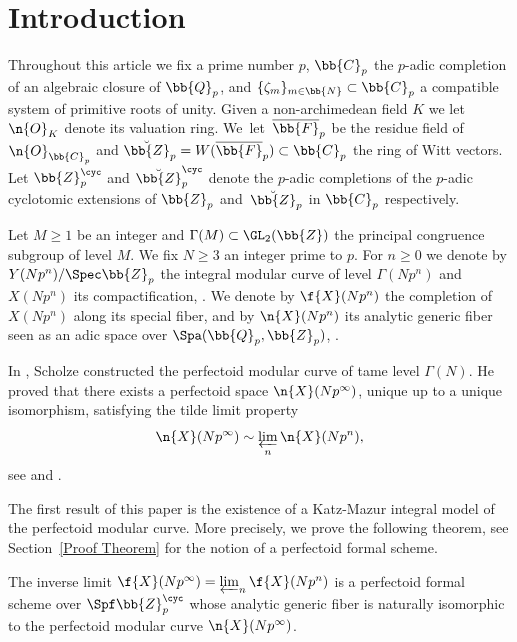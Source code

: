 \section*{Introduction}
Throughout this article we fix a prime number $p$, $\bb{C}_p$ the $p$-adic completion of an algebraic closure of $\bb{Q}_p$, and $\{\zeta_{m}\}_{m\in \bb{N}}\subset \bb{C}_p$ a compatible system of primitive roots of unity. Given a non-archimedean field $K$ we let $\n{O}_K$ denote its valuation ring. We~let~$\overline{\bb{F}}_p$ be the residue field of $\n{O}_{\bb{C}_p}$ and $\breve{\bb{Z}}_p=W(\overline{\bb{F}}_p)\subset \bb{C}_p$ the ring of Witt vectors. Let $\bb{Z}_p^{\cyc}$ and $\breve{\bb{Z}}_p^{\cyc}$ denote the $p$-adic completions of the $p$-adic cyclotomic extensions of $\bb{Z}_p$ and~$\breve{\bb{Z}}_p$ in $\bb{C}_p$ respectively.

Let $M\geq 1$ be an integer and $\Gamma(M)\subset \GL_2(\bb{Z})$ the principal congruence subgroup of level $M$. We fix $N\geq 3$ an integer prime to $p$. For $n\geq 0$ we denote by $Y(Np^n)/ \Spec \bb{Z}_p$ the integral modular curve of level $\Gamma(Np^n)$ and $X(Np^n)$ its compactification, \cf \cite{katz1985arithmetic}. We denote by $\f{X}(Np^n)$ the completion of $X(Np^n)$ along its special fiber, and by $\n{X}(Np^n)$ its analytic generic fiber seen as an adic space over $\Spa(\bb{Q}_p, \bb{Z}_p)$, \cf \cite{MR1734903}.

In \cite{scholzeTorsCoho2015}, Scholze constructed the perfectoid modular curve of tame level $\Gamma(N)$. He proved that there exists a perfectoid space $\n{X}(Np^\infty)$, unique up to a unique isomorphism, satisfying the tilde limit property
\[
\n{X}(Np^\infty)\sim \varprojlim_n \n{X}(Np^n),
\]
see \cite[Def.\,2.4.1]{scholze2013moduli} and \cite[Def.\,2.4.2]{MR1734903}.

The first result of this paper is the existence of a Katz-Mazur integral model of the perfectoid modular curve. More precisely, we prove the following theorem, see Section~\ref{Proof Theorem} for the notion of a perfectoid formal scheme.

\begin{theo}
\label{Theo1Intro}
The inverse limit $\f{X}(Np^\infty)= \varprojlim_n \f{X}(Np^n)$ is a perfectoid formal scheme over $\Spf \bb{Z}_p^{\cyc}$ whose analytic generic fiber is naturally isomorphic to the perfectoid modular curve $\n{X}(Np^\infty)$.
\end{theo}

